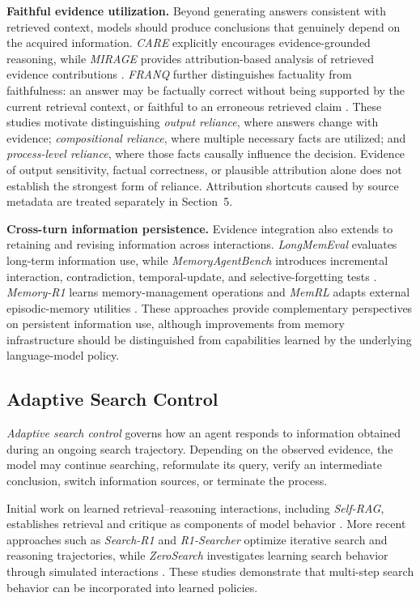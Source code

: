 \textbf{Faithful evidence utilization.}
Beyond generating answers consistent with retrieved context, models should produce conclusions that genuinely depend on the acquired information. \textit{CARE} explicitly encourages evidence-grounded reasoning, while \textit{MIRAGE} provides attribution-based analysis of retrieved evidence contributions \cite{care,mirage}. \textit{FRANQ} further distinguishes factuality from faithfulness: an answer may be factually correct without being supported by the current retrieval context, or faithful to an erroneous retrieved claim \cite{franq}. These studies motivate distinguishing \emph{output reliance}, where answers change with evidence; \emph{compositional reliance}, where multiple necessary facts are utilized; and \emph{process-level reliance}, where those facts causally influence the decision. Evidence of output sensitivity, factual correctness, or plausible attribution alone does not establish the strongest form of reliance. Attribution shortcuts caused by source metadata are treated separately in Section~5.

\textbf{Cross-turn information persistence.}
Evidence integration also extends to retaining and revising information across interactions. \textit{LongMemEval} evaluates long-term information use, while \textit{MemoryAgentBench} introduces incremental interaction, contradiction, temporal-update, and selective-forgetting tests \cite{longmemeval,memoryagentbench}. \textit{Memory-R1} learns memory-management operations and \textit{MemRL} adapts external episodic-memory utilities \cite{memory_r1,memrl}. These approaches provide complementary perspectives on persistent information use, although improvements from memory infrastructure should be distinguished from capabilities learned by the underlying language-model policy.

\subsection{Adaptive Search Control}
\label{sec:adaptive_search_control}

\textit{Adaptive search control} governs how an agent responds to information obtained during an ongoing search trajectory. Depending on the observed evidence, the model may continue searching, reformulate its query, verify an intermediate conclusion, switch information sources, or terminate the process.

Initial work on learned retrieval--reasoning interactions, including \textit{Self-RAG}, establishes retrieval and critique as components of model behavior \cite{selfrag}. More recent approaches such as \textit{Search-R1} and \textit{R1-Searcher} optimize iterative search and reasoning trajectories, while \textit{ZeroSearch} investigates learning search behavior through simulated interactions \cite{search_r1,r1_searcher,zerosearch}. These studies demonstrate that multi-step search behavior can be incorporated into learned policies.

